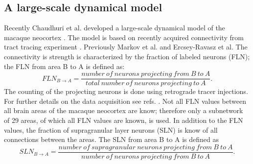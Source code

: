 \subsection{ A large-scale dynamical model}

Recently Chaudhuri et al. developed a large-scale dynamical model of the macaque neocortex \cite{chaudhuri2015large-scale}.
The model is based on recently acquired connectivity from tract tracing experiment \cite{markov2012weighted, markov2014anatomy}. Previously Markov et al. and Ercsey-Ravasz et al. 
The connectivity is strength is characterized by the fraction of labeled neurons (FLN); the FLN from area B to A is defined as:
\begin{equation}
FLN_{B\rightarrow A} = \frac{number\ of\ neurons\ projecting\ from\ B\ to\ A}{total\ number\ of\ neurons\ projecting\ to\ A}.
\end{equation}
The counting of the projecting neurons is done using retrograde tracer injections. For further details on the data acquisition see refs. \cite{markov2012weighted, markov2014anatomy, markov2011weight, kennedy2013data}. 
Not all FLN values between all brain areas of the macaque neocortex are know; therefore only a subnetwork of 29 areas, of which all FLN values are known, is used.
In addition to the FLN values, the fraction of supragranular layer neurons (SLN) is know of all connections between the areas. The SLN from area B to A is defined as
\begin{equation}
SLN_{B\rightarrow A} = \frac{number\ of\ supragranular\ neurons\ projecting\ from\ B\ to\ A}{number\ of\ neurons\ projecting\ from\ B\ to\ A}.
\end{equation}

